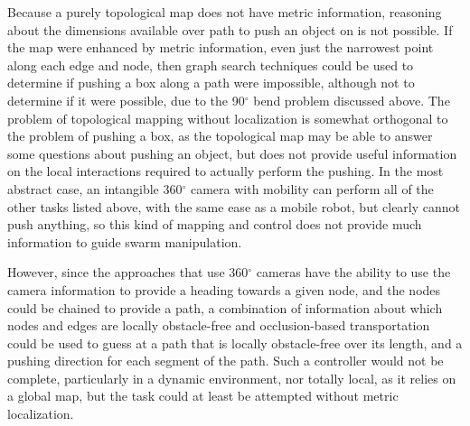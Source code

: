 Because a purely topological map does not have metric information, reasoning about the dimensions available over path to push an object on is not possible. 
If the map were enhanced by metric information, even just the narrowest point along each edge and node, then graph search techniques could be used to determine if pushing a box along a path were impossible, although not to determine if it were possible, due to the 90$^\circ$ bend problem discussed above. 
The problem of topological mapping without localization is somewhat orthogonal to the problem of pushing a box, as the topological map may be able to answer some questions about pushing an object, but does not provide useful information on the local interactions required to actually perform the pushing. 
In the most abstract case, an intangible 360$^\circ$ camera with mobility can perform all of the other tasks listed above, with the same ease as a mobile robot, but clearly cannot push anything, so this kind of mapping and control does not provide much information to guide swarm manipulation. 

However, since the approaches that use 360$^\circ$ cameras have the ability to use the camera information to provide a heading towards a given node, and the nodes could be chained to provide a path, a combination of information about which nodes and edges are locally obstacle-free and occlusion-based transportation could be used to guess at a path that is locally obstacle-free over its length, and a pushing direction for each segment of the path. 
Such a controller would not be complete, particularly in a dynamic environment, nor totally local, as it relies on a global map, but the task could at least be attempted without metric localization. 

